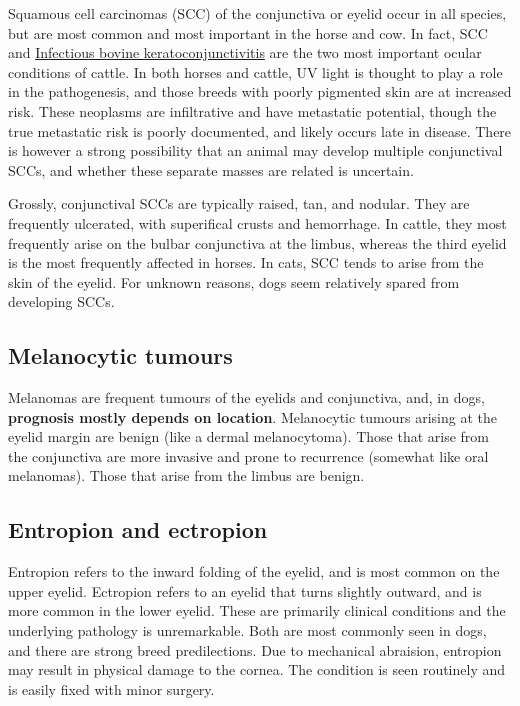 \documentclass[
  openany]{article}
\begin{document}
Squamous cell carcinomas (SCC) of the conjunctiva or eyelid occur in all species, but are most common and most important in the horse and cow. In fact, SCC and \protect\hyperlink{infectious-bovine-keratoconjunctivitis}{Infectious bovine keratoconjunctivitis} are the two most important ocular conditions of cattle. In both horses and cattle, UV light is thought to play a role in the pathogenesis, and those breeds with poorly pigmented skin are at increased risk. These neoplasms are infiltrative and have metastatic potential, though the true metastatic risk is poorly documented, and likely occurs late in disease. There is however a strong possibility that an animal may develop multiple conjunctival SCCs, and whether these separate masses are related is uncertain.

Grossly, conjunctival SCCs are typically raised, tan, and nodular. They are frequently ulcerated, with superifical crusts and hemorrhage. In cattle, they most frequently arise on the bulbar conjunctiva at the limbus, whereas the third eyelid is the most frequently affected in horses. In cats, SCC tends to arise from the skin of the eyelid. For unknown reasons, dogs seem relatively spared from developing SCCs.

\hypertarget{melanocytic-tumours}{%
\subsection{Melanocytic tumours}\label{melanocytic-tumours}}

Melanomas are frequent tumours of the eyelids and conjunctiva, and, in dogs, \textbf{prognosis mostly depends on location}. Melanocytic tumours arising at the eyelid margin are benign (like a dermal melanocytoma). Those that arise from the conjunctiva are more invasive and prone to recurrence (somewhat like oral melanomas). Those that arise from the limbus are benign.

\hypertarget{entropion-and-ectropion}{%
\subsection{Entropion and ectropion}\label{entropion-and-ectropion}}

Entropion refers to the inward folding of the eyelid, and is most common on the upper eyelid. Ectropion refers to an eyelid that turns slightly outward, and is more common in the lower eyelid. These are primarily clinical conditions and the underlying pathology is unremarkable. Both are most commonly seen in dogs, and there are strong breed predilections. Due to mechanical abraision, entropion may result in physical damage to the cornea. The condition is seen routinely and is easily fixed with minor surgery.
\end{document}
